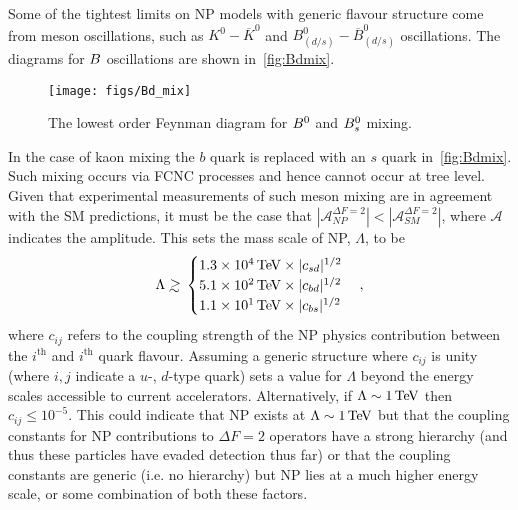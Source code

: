  Some of the tightest limits on NP models with generic flavour structure come from meson oscillations, such as $K^{0} - \overline{K}^{0}$ and $B^{0}_{(d/s)} - \overline{B}^{0}_{(d/s)}$ oscillations. The diagrams for ${B}$ oscillations are shown in~\autoref{fig:Bdmix}.
\begin{figure}[!h]\def\nh{0.5\textwidth}
  \centering
  \texttt{[image: figs/Bd\_mix]}
  \caption{The lowest order Feynman diagram for ${{B}^0}$ and ${{B}^0_{s}}$ mixing.}
  \label{fig:Bdmix}
\end{figure}
In the case of kaon mixing the $b$ quark is replaced with an $s$ quark in~\autoref{fig:Bdmix}.
Such mixing occurs via FCNC processes and hence cannot occur at tree level. %
Given that experimental measurements of such meson mixing are in agreement with the SM predictions\cite{bpimumuff1}, it must be the case that $|\mathcal{A}_{NP}^{\Delta F = 2}|<|\mathcal{A}_{SM}^{\Delta F = 2}|$, where $\mathcal{A}$ indicates the amplitude. This  sets the mass scale of NP, $\Lambda$, to be~\cite{kaonmix}%
\begin{equation}
  \Lambda\gsim%
  \begin{cases}
    1.3\times 10^{4}\tev \times |c_{sd}|^{1/2}\\
    5.1\times 10^{2}\tev \times |c_{bd}|^{1/2}\\
    1.1\times 10^{1}\tev \times |c_{bs}|^{1/2}\\
  \end{cases},
\end{equation}
where $c_{ij}$ refers to the coupling strength of the NP physics contribution between the $i^{\mathrm{th}}$ and $i^{\mathrm{th}}$ quark flavour.
Assuming a generic structure where $c_{ij}$ is unity (where $i,j$ indicate a $u$-, $d$-type quark) sets a value for $\Lambda$ beyond the energy scales accessible to current accelerators. Alternatively, if $\Lambda \sim 1\mathrm{\,Te\kern -0.1em V}$ then $c_{ij} \leq 10^{-5}$. This could indicate that NP exists at $\Lambda \sim 1\mathrm{\,Te\kern -0.1em V}$  but that the coupling constants for NP contributions to $\Delta F=2$ operators have a strong hierarchy (and thus these particles have evaded detection thus far) or that the coupling constants are generic (i.e. no hierarchy) but NP lies at a much higher energy scale, or some combination of both these factors.

